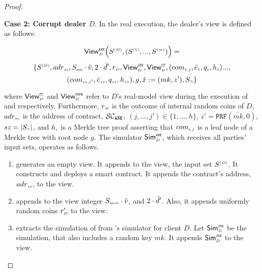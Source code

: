 \begin{proof}
\



\noindent\textbf{Case 2: Corrupt dealer $D$}.  In the real execution, the dealer's view is defined as follows: 


$$ \mathsf{View}_{\scriptscriptstyle D}^{\scriptscriptstyle \mathtt{ANE}} \Big(S^{\scriptscriptstyle (D)}, (S^{\scriptscriptstyle (1)},..., S^{\scriptscriptstyle (m)})\Big)=$$ $$ \{S^{\st (D)}, adr_{\st sc}, S_{\minn}\cdot \vc, 2\cdot \dc', 
%
%
 r_{\st D},  \mathsf{View}^{\st \fpsi}_{\st D}, \mathsf{View}^{\st \ct}_{\st D}, (com_{\st 1,j}, \bar{e}_{\st 1}, q_{\st 1}, h_{\st 1})...,$$ $$ (com_{\scriptscriptstyle sz, j'}, \bar{e}_{\scriptscriptstyle sz}, q_{\scriptscriptstyle {sz}}, h_{\scriptscriptstyle sz}), g, \hat{x}:=({mk}, z'), 
  S_{\scriptscriptstyle \cap}\}$$

where  $\mathsf{View}^{\scriptscriptstyle \mathtt{CT}}_{\scriptscriptstyle D}$ and $\mathsf{View}^{\scriptscriptstyle \mathtt{VOPR}}_{\scriptscriptstyle D}$ refer to $D$'s real-model view during the execution of \ct and \vopr respectively. Furthermore, $r_{\scriptscriptstyle D}$ is the outcome of internal random coins of $D$, $adr_{\scriptscriptstyle sc}$ is the address of contract, $\mathcal{SC}_{\mathtt{ANE}}$, $(j, ...,j')\in \{1,..., h\}$, $z'=\mathtt{PRF}(\bar{mk}, 0)$, $sz=|S_{\scriptscriptstyle \cap}|$, and $h_{\scriptscriptstyle i}$ is a Merkle tree proof asserting that $com_{\scriptscriptstyle i,j}$ is a leaf node of a Merkle tree with root node $g$. The simulator $\mathsf{Sim}^{\scriptscriptstyle \mathtt{ANE}}_{\scriptscriptstyle D}$, which receives all parties' input sets, operates as follows. 

\begin{enumerate}

%
\item generates an empty view. It appends to the view, the input set $S^{\scriptscriptstyle (D)}$. It constructs and deploys a smart contract. It appends the contract's address, $ {adr}_{\scriptscriptstyle sc}$, to the view. 


\item appends to the view integer $S_{\scriptscriptstyle min}\cdot \ddot{v}$, and $2\cdot \ddot{d}'$. Also, it appends uniformly random coins $r'_{\scriptscriptstyle D}$ to the view. 

%
\item extracts the simulation of \fpsi from \fpsi's simulator for client $D$. Let $\mathsf{Sim}^{\scriptscriptstyle \mathtt{JUS}}_{\scriptscriptstyle D}$ be the simulation, that also includes a random key $mk$. It appends $\mathsf{Sim}^{\scriptscriptstyle \mathtt{JUS}}_{\scriptscriptstyle D}$ to the view. 



\end{enumerate}
\end{proof}
